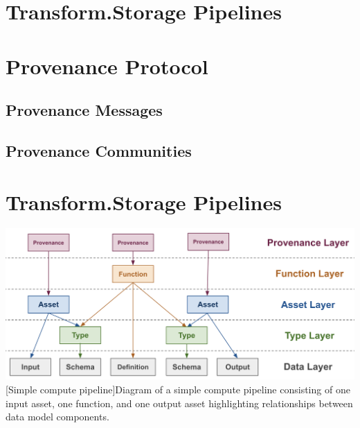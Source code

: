 \documentclass[9pt, oneside]{article}   	%
\begin{document}
\begin{multicols}{2}
\section{Transform.Storage Pipelines}\label{transformpipes}

\section{Provenance Protocol}\label{provprotocol}

\subsection{Provenance Messages}\label{provMessages}

\subsection{Provenance Communities}\label{provCommunities}

\section{Transform.Storage Pipelines}\label{transformpipes}





\end{multicols}
\begin{center}
    
\includegraphics[width=1\columnwidth]{pipeline_layers_20230715}
[Simple compute pipeline]{Diagram of a simple compute pipeline consisting of one input asset, one function, and one output asset highlighting relationships between data model components.}
\label{simplePipeline}
\end{center}
\begin{multicols}{2}

{}


\end{multicols}
\end{document}
